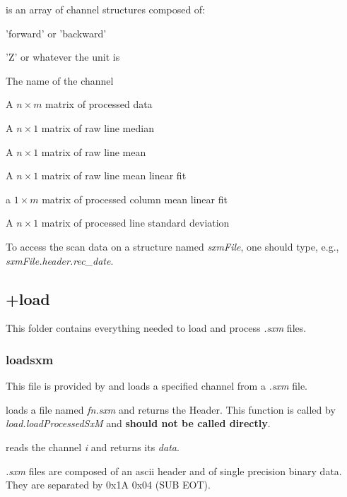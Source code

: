 \item[channels] is an array of channel structures composed of:
  \bdf
  \item[Direction] 'forward' or 'backward'
  \item[Unit] 'Z' or whatever the unit is
  \item[Name] The name of the channel
  \item[data] A $n\times m$ matrix of processed data
  \item[lineMedian] A $n\times 1$ matrix of raw line median
  \item[lineMean] A $n\times 1$ matrix of raw line mean
  \item[linePlane] A $n\times 1$ matrix of raw line mean linear fit
  \item[lineResidualSlope] a $1\times m$ matrix of processed column mean linear fit
  \item[lineStd] A $n\times 1$ matrix of processed line standard deviation
  \edf
\edf

To access the scan data on a structure named \emph{sxmFile}, one should type, e.g., \emph{sxmFile.header.rec\_date}.

\subsection{+load}
This folder contains everything needed to load and process \emph{.sxm} files.
\subsubsection{loadsxm}
This file is provided by \nanonis{} and loads a specified channel from a \emph{.sxm} file.
\bdf

 loads a file named \emph{fn.sxm} and returns the Header. This function is called by \emph{load.loadProcessedSxM} and \textbf{should not be called directly}.

 reads the channel \emph{i} and returns its \emph{data}.

\edf

\emph{.sxm} files are composed of an ascii header and of single precision binary data. They are separated by 0x1A 0x04 (SUB EOT).

